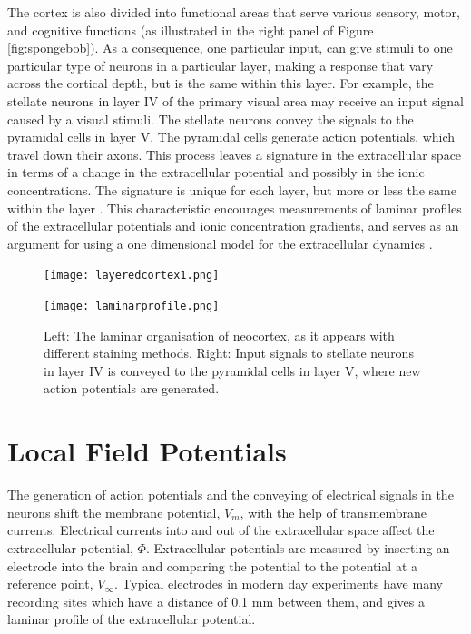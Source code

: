 \documentclass{uiophd}
\begin{document}
The cortex is also divided into functional areas that serve various sensory, motor, and cognitive functions (as illustrated in the right panel of Figure \ref{fig:spongebob}). As a consequence, one particular input, can give stimuli to one particular type of neurons in a particular layer, making a response that vary across the cortical depth, but is the same within this layer. For example, the stellate neurons in layer IV of the primary visual area may receive an input signal caused by a visual stimuli. The stellate neurons convey the signals to the pyramidal cells in layer V. The pyramidal cells generate action potentials, which travel down their axons. This process leaves a signature in the extracellular space in terms of a change in the extracellular potential and possibly in the ionic concentrations. The signature is unique for each layer, but more or less the same within the layer \cite{Neuroscience}. This characteristic encourages measurements of laminar profiles of the extracellular potentials and ionic concentration gradients, and serves as an argument for using a one dimensional model for the extracellular dynamics \cite{Mayer2010}.



\begin{figure}[!tbp]
  \centering
  \begin{minipage}[b]{0.5\textwidth}
    \texttt{[image: layeredcortex1.png]}
  \end{minipage}
  \hfill
  \begin{minipage}[b]{0.45\textwidth}
    \texttt{[image: laminarprofile.png]}
  \end{minipage}  
   \caption{Left: The laminar organisation of neocortex, as it appears with different staining methods. Right: Input signals to stellate neurons in layer IV is conveyed to the pyramidal cells in layer V, where new action potentials are generated.}
  \label{fig:laminarcortex}
\end{figure}



\section{Local Field Potentials}\label{Local Field Potentials}
The generation of action potentials and the conveying of electrical signals in the neurons shift the membrane potential, $V_m$, with the help of transmembrane currents. Electrical currents into and out of the extracellular space affect the extracellular potential, $\Phi$. Extracellular potentials are measured by inserting an electrode into the brain and comparing the potential to the potential at a reference point, $V_{\infty}$. Typical  electrodes in modern day experiments have many recording sites which have a distance of 0.1 mm \cite{EinevollLFP} between them, and gives a laminar profile of the extracellular potential. 
\end{document}
